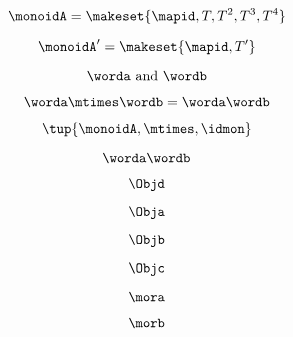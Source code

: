 {\begin{forslides}
        \begin{equation}
            \monoidA = \makeset{ \mapid, T, T^2, T^3, T^4 }
        \end{equation}

        \begin{equation}
            \monoidA' = \makeset{ \mapid, T' }
        \end{equation}

        \begin{equation}
            \worda \text{ and } \wordb
        \end{equation}

        \begin{equation}
            \label{eq:string-semigroup-wordab-2}
            \worda \mtimes  \wordb =  \worda \wordb
        \end{equation}

        \begin{equation}
            \tup{ \monoidA, \mtimes, \idmon}
        \end{equation}

        \begin{equation}
            \label{eq:string-semigroup-wordab-concat-2}
            \worda \wordb
        \end{equation}

        \begin{equation}
            \label{eq:00}
            \Objd
        \end{equation}

        \begin{equation}
            \label{eq:01}
            \Obja
        \end{equation}

        \begin{equation}
            \label{eq:02}
            \Objb
        \end{equation}

        \begin{equation}
            \label{eq:03}
            \Objc
        \end{equation}

        \begin{equation}
            \label{eq:04}
            \mora
        \end{equation}

        \begin{equation}
            \label{eq:05}
            \morb
        \end{equation}


\end{forslides}}
